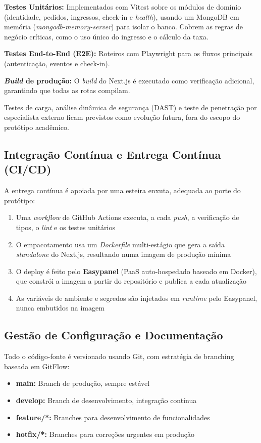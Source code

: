 \textbf{Testes Unitários:} Implementados com Vitest sobre os módulos de domínio (identidade, pedidos, ingressos, check-in e \textit{health}), usando um MongoDB em memória (\textit{mongodb-memory-server}) para isolar o banco. Cobrem as regras de negócio críticas, como o uso único do ingresso e o cálculo da taxa.

\textbf{Testes End-to-End (E2E):} Roteiros com Playwright para os fluxos principais (autenticação, eventos e check-in).

\textbf{\textit{Build} de produção:} O \textit{build} do Next.js é executado como verificação adicional, garantindo que todas as rotas compilam.

Testes de carga, análise dinâmica de segurança (DAST) e teste de penetração por especialista externo ficam previstos como evolução futura, fora do escopo do protótipo acadêmico.

\subsection{Integração Contínua e Entrega Contínua (CI/CD)}

A entrega contínua é apoiada por uma esteira enxuta, adequada ao porte do protótipo:

\begin{enumerate}
    \item Uma \textit{workflow} de GitHub Actions executa, a cada \textit{push}, a verificação de tipos, o \textit{lint} e os testes unitários
    \item O empacotamento usa um \textit{Dockerfile} multi-estágio que gera a saída \textit{standalone} do Next.js, resultando numa imagem de produção mínima
    \item O deploy é feito pelo \textbf{Easypanel} (PaaS auto-hospedado baseado em Docker), que constrói a imagem a partir do repositório e publica a cada atualização
    \item As variáveis de ambiente e segredos são injetados em \textit{runtime} pelo Easypanel, nunca embutidos na imagem
\end{enumerate}

\subsection{Gestão de Configuração e Documentação}

Todo o código-fonte é versionado usando Git, com estratégia de branching baseada em GitFlow:

\begin{itemize}
    \item \textbf{main:} Branch de produção, sempre estável
    \item \textbf{develop:} Branch de desenvolvimento, integração contínua
    \item \textbf{feature/*:} Branches para desenvolvimento de funcionalidades
    \item \textbf{hotfix/*:} Branches para correções urgentes em produção
\end{itemize}

